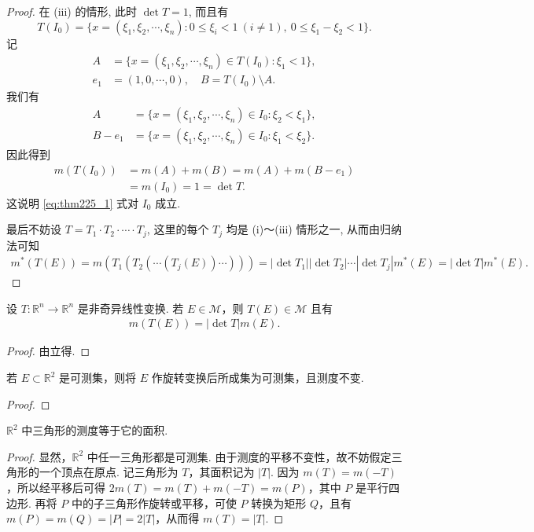 \documentclass[../../main.tex]{subfiles}%
\begin{document}
\begin{proof}
在 (iii) 的情形, 此时 $\det T = 1$, 而且有
\[
T(I_0) = \{x = (\xi_1,\xi_2,\cdots,\xi_n): 0\leqslant\xi_i < 1\ (i\neq 1),\ 0\leqslant\xi_1 - \xi_2 < 1\}.
\]
记
\begin{align*}
A &= \{x = (\xi_1,\xi_2,\cdots,\xi_n)\in T(I_0): \xi_1 < 1\},\\
e_1 &= (1,0,\cdots,0),\quad B = T(I_0)\setminus A.
\end{align*}
我们有
\begin{align*}
A &= \{x = (\xi_1,\xi_2,\cdots,\xi_n)\in I_0: \xi_2 < \xi_1\},\\
B - e_1 &= \{x = (\xi_1,\xi_2,\cdots,\xi_n)\in I_0: \xi_1 < \xi_2\}.
\end{align*}
因此得到
\begin{align*}
m(T(I_0)) &= m(A) + m(B) = m(A) + m(B - e_1)\\
&= m(I_0) = 1 = \det T.
\end{align*}
这说明 \eqref{eq:thm225_1} 式对 $I_0$ 成立.

最后不妨设 $T = T_1\cdot T_2\cdot\cdots\cdot T_j$, 这里的每个 $T_j$ 均是 (i)～(iii) 情形之一, 从而由归纳法可知
\begin{align*}
m^*(T(E)) = m(T_1(T_2(\cdots(T_j(E))\cdots)))
= |\det T_1||\det T_2|\cdots|\det T_j|m^*(E)= |\det T|m^*(E).
\end{align*}

\end{proof}

\begin{corollary}
设 \(T:\mathbb{R}^n \to \mathbb{R}^n\) 是非奇异线性变换. 若 \(E \in \mathscr{M}\)，则 \(T(E)\in\mathscr{M}\) 且有
\begin{align*}
m(T(E)) = |\det T|m(E).
\end{align*}
\end{corollary}
\begin{proof}

由立得.

\end{proof}

\begin{example}
若 \(E \subset \mathbb{R}^2\) 是可测集，则将 \(E\) 作旋转变换后所成集为可测集，且测度不变.
\end{example}
\begin{proof}



\end{proof}

\begin{example}
\(\mathbb{R}^2\) 中三角形的测度等于它的面积.
\end{example}
\begin{proof}

显然，\(\mathbb{R}^2\) 中任一三角形都是可测集. 由于测度的平移不变性，故不妨假定三角形的一个顶点在原点. 记三角形为 \(T\)，其面积记为 \(|T|\). 因为 \(m(T)=m(-T)\)，所以经平移后可得 \(2m(T)=m(T)+m(-T)=m(P)\)，其中 \(P\) 是平行四边形. 再将 \(P\) 中的子三角形作旋转或平移，可使 \(P\) 转换为矩形 \(Q\)，且有 \(m(P)=m(Q)=|P| = 2|T|\)，从而得 \(m(T)=|T|\).

\end{proof}
\end{document}
